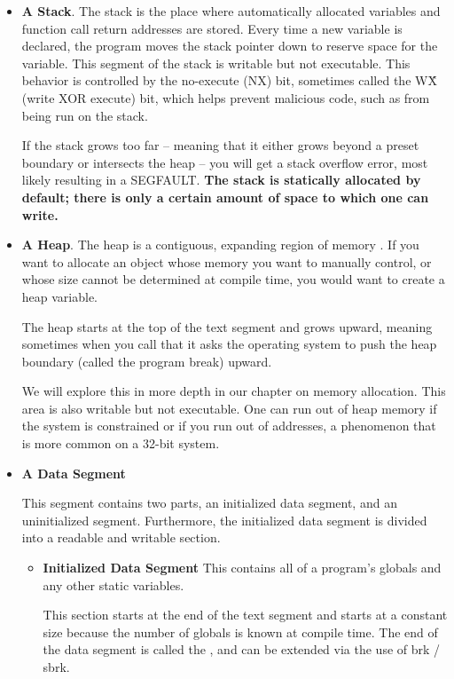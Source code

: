 \begin{itemize}
\item \textbf{A Stack}.
The stack is the place where automatically allocated variables and function call return addresses are stored.
Every time a new variable is declared, the program moves the stack pointer down to reserve space for the variable.
This segment of the stack is writable but not executable.
This behavior is controlled by the no-execute (NX) bit, sometimes called the W\^X (write XOR execute) bit, which helps prevent malicious code, such as  from being run on the stack.

If the stack grows too far -- meaning that it either grows beyond a preset boundary or intersects the heap -- you will get a stack overflow error, most likely resulting in a SEGFAULT.
\textbf{The stack is statically allocated by default; there is only a certain amount of space to which one can write.}

\item \textbf{A Heap}.
The heap is a contiguous, expanding region of memory \cite{mallocinternals}.
If you want to allocate an object whose memory you want to manually control, or whose size cannot be determined at compile time, you would want to create a heap variable.

The heap starts at the top of the text segment and grows upward, meaning sometimes when you call  that it asks the operating system to push the heap boundary (called the program break) upward.

We will explore this in more depth in our chapter on memory allocation.
This area is also writable but not executable.
One can run out of heap memory if the system is constrained or if you run out of addresses, a phenomenon that is more common on a 32-bit system.

\item \textbf{A Data Segment}

  This segment contains two parts, an initialized data segment, and an uninitialized segment.
  Furthermore, the initialized data segment is divided into a readable and writable section.

\begin{itemize}
    \item \textbf{Initialized Data Segment}
          This contains all of a program's globals and any other static variables.

          This section starts at the end of the text segment and starts at a constant size because the number of globals is known at compile time. The end of the data segment is called the , and can be extended via the use of brk / sbrk.


\end{itemize}
\end{itemize}
